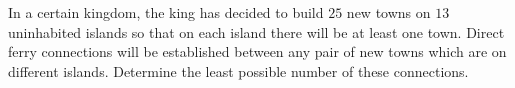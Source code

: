 In a certain kingdom, the king has decided to build $25$ new towns on $13$ uninhabited islands so that on each island there will be at least one town. Direct ferry connections will be established between any pair of new towns which are on different islands. Determine the least possible number of these connections.